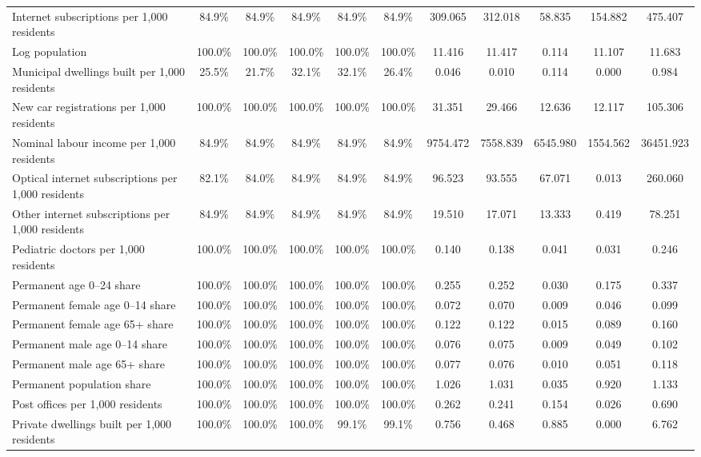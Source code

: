\begin{table}
{\begin{tabular}{lcccccccccc}
Internet subscriptions per 1,000 residents & 84.9\% & 84.9\% & 84.9\% & 84.9\% & 84.9\% & 309.065 & 312.018 & 58.835 & 154.882 & 475.407 \\
Log population & 100.0\% & 100.0\% & 100.0\% & 100.0\% & 100.0\% & 11.416 & 11.417 & 0.114 & 11.107 & 11.683 \\
Municipal dwellings built per 1,000 residents & 25.5\% & 21.7\% & 32.1\% & 32.1\% & 26.4\% & 0.046 & 0.010 & 0.114 & 0.000 & 0.984 \\
New car registrations per 1,000 residents & 100.0\% & 100.0\% & 100.0\% & 100.0\% & 100.0\% & 31.351 & 29.466 & 12.636 & 12.117 & 105.306 \\
Nominal labour income per 1,000 residents & 84.9\% & 84.9\% & 84.9\% & 84.9\% & 84.9\% & 9754.472 & 7558.839 & 6545.980 & 1554.562 & 36451.923 \\
Optical internet subscriptions per 1,000 residents & 82.1\% & 84.0\% & 84.9\% & 84.9\% & 84.9\% & 96.523 & 93.555 & 67.071 & 0.013 & 260.060 \\
Other internet subscriptions per 1,000 residents & 84.9\% & 84.9\% & 84.9\% & 84.9\% & 84.9\% & 19.510 & 17.071 & 13.333 & 0.419 & 78.251 \\
Pediatric doctors per 1,000 residents & 100.0\% & 100.0\% & 100.0\% & 100.0\% & 100.0\% & 0.140 & 0.138 & 0.041 & 0.031 & 0.246 \\
Permanent age 0--24 share & 100.0\% & 100.0\% & 100.0\% & 100.0\% & 100.0\% & 0.255 & 0.252 & 0.030 & 0.175 & 0.337 \\
Permanent female age 0--14 share & 100.0\% & 100.0\% & 100.0\% & 100.0\% & 100.0\% & 0.072 & 0.070 & 0.009 & 0.046 & 0.099 \\
Permanent female age 65+ share & 100.0\% & 100.0\% & 100.0\% & 100.0\% & 100.0\% & 0.122 & 0.122 & 0.015 & 0.089 & 0.160 \\
Permanent male age 0--14 share & 100.0\% & 100.0\% & 100.0\% & 100.0\% & 100.0\% & 0.076 & 0.075 & 0.009 & 0.049 & 0.102 \\
Permanent male age 65+ share & 100.0\% & 100.0\% & 100.0\% & 100.0\% & 100.0\% & 0.077 & 0.076 & 0.010 & 0.051 & 0.118 \\
Permanent population share & 100.0\% & 100.0\% & 100.0\% & 100.0\% & 100.0\% & 1.026 & 1.031 & 0.035 & 0.920 & 1.133 \\
Post offices per 1,000 residents & 100.0\% & 100.0\% & 100.0\% & 100.0\% & 100.0\% & 0.262 & 0.241 & 0.154 & 0.026 & 0.690 \\
Private dwellings built per 1,000 residents & 100.0\% & 100.0\% & 100.0\% & 99.1\% & 99.1\% & 0.756 & 0.468 & 0.885 & 0.000 & 6.762 \\

\end{tabular}}
\end{table}
